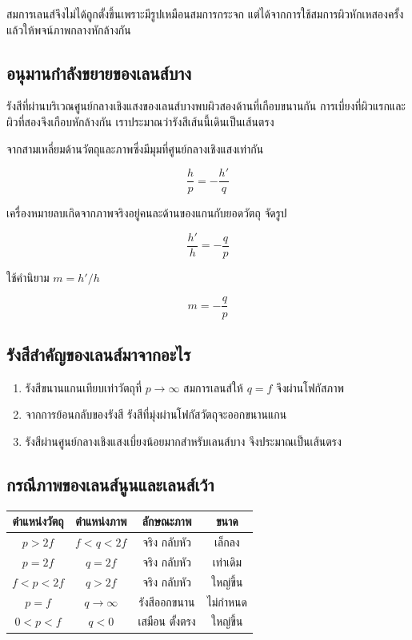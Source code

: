 สมการเลนส์จึงไม่ได้ถูกตั้งขึ้นเพราะมีรูปเหมือนสมการกระจก แต่ได้จากการใช้สมการผิวหักเหสองครั้งแล้วให้พจน์ภาพกลางหักล้างกัน

\subsection{อนุมานกำลังขยายของเลนส์บาง}

รังสีที่ผ่านบริเวณศูนย์กลางเชิงแสงของเลนส์บางพบผิวสองด้านที่เกือบขนานกัน การเบี่ยงที่ผิวแรกและผิวที่สองจึงเกือบหักล้างกัน เราประมาณว่ารังสีเส้นนี้เดินเป็นเส้นตรง

จากสามเหลี่ยมด้านวัตถุและภาพซึ่งมีมุมที่ศูนย์กลางเชิงแสงเท่ากัน

\[
\frac{h}{p}=-\frac{h'}{q}
\]

เครื่องหมายลบเกิดจากภาพจริงอยู่คนละด้านของแกนกับยอดวัตถุ จัดรูป

\[
\frac{h'}{h}=-\frac{q}{p}
\]

ใช้คำนิยาม $m=h'/h$

\begin{tcolorbox}[title={กำลังขยายของเลนส์บาง}]
\[
\boxed{m=-\frac{q}{p}}
\]
\end{tcolorbox}

\subsection{รังสีสำคัญของเลนส์มาจากอะไร}

\begin{enumerate}
    \item รังสีขนานแกนเทียบเท่าวัตถุที่ $p\to\infty$ สมการเลนส์ให้ $q=f$ จึงผ่านโฟกัสภาพ
    \item จากการย้อนกลับของรังสี รังสีที่มุ่งผ่านโฟกัสวัตถุจะออกขนานแกน
    \item รังสีผ่านศูนย์กลางเชิงแสงเบี่ยงน้อยมากสำหรับเลนส์บาง จึงประมาณเป็นเส้นตรง
\end{enumerate}

\subsection{กรณีภาพของเลนส์นูนและเลนส์เว้า}

\begin{center}
\begin{tabular}{|c|c|c|c|}
\hline
ตำแหน่งวัตถุ & ตำแหน่งภาพ & ลักษณะภาพ & ขนาด \\
\hline
$p>2f$ & $f<q<2f$ & จริง กลับหัว & เล็กลง \\
\hline
$p=2f$ & $q=2f$ & จริง กลับหัว & เท่าเดิม \\
\hline
$f<p<2f$ & $q>2f$ & จริง กลับหัว & ใหญ่ขึ้น \\
\hline
$p=f$ & $q\to\infty$ & รังสีออกขนาน & ไม่กำหนด \\
\hline
$0<p<f$ & $q<0$ & เสมือน ตั้งตรง & ใหญ่ขึ้น \\
\hline
\end{tabular}
\end{center}

